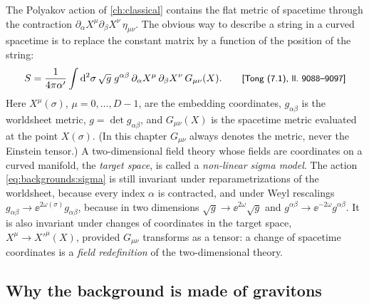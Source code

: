 The Polyakov action of \cref{ch:classical} contains the flat metric of spacetime through the
contraction $\partial_\alpha X^\mu\partial_\beta X^\nu\,\eta_{\mu\nu}$. The obvious way to
describe a string in a curved spacetime is to replace the constant matrix by a function of
the position of the string:
\begin{equation}\label{eq:backgrounds:sigma}
  S=\frac{1}{4\pi\alpha'}\int\mathrm{d}^2\sigma\,\sqrt g\;g^{\alpha\beta}\,
  \partial_\alpha X^\mu\,\partial_\beta X^\nu\,G_{\mu\nu}(X).
  \qquad\text{{\small\textsf{[Tong (7.1), ll.~9088--9097]}}}
\end{equation}
Here $X^\mu(\sigma)$, $\mu=0,\dots,D-1$, are the embedding coordinates, $g_{\alpha\beta}$ is
the worldsheet metric, $g=\det g_{\alpha\beta}$, and $G_{\mu\nu}(X)$ is the spacetime metric
evaluated at the point $X(\sigma)$. (In this chapter $G_{\mu\nu}$ always denotes the metric,
never the Einstein tensor.) A two-dimensional field theory whose fields are coordinates on a
curved manifold, the \emph{target space}, is called a \emph{non-linear sigma
model}. The action
\eqref{eq:backgrounds:sigma} is still invariant under reparametrizations of the worldsheet,
because every index $\alpha$ is contracted, and under Weyl rescalings
$g_{\alpha\beta}\to\ee^{2\omega(\sigma)}g_{\alpha\beta}$, because in two dimensions
$\sqrt g\to\ee^{2\omega}\sqrt g$ and $g^{\alpha\beta}\to\ee^{-2\omega}g^{\alpha\beta}$. It is
also invariant under changes of coordinates in the target space, $X^\mu\to X'^\mu(X)$,
provided $G_{\mu\nu}$ transforms as a tensor: a change of spacetime coordinates is a
\emph{field redefinition} of the two-dimensional theory.

\subsection{Why the background is made of gravitons}

